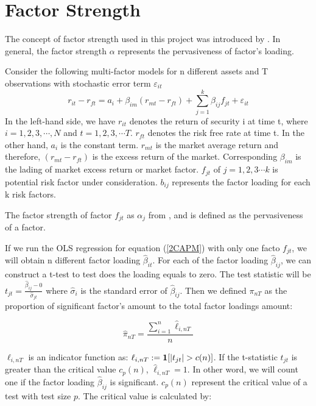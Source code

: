 \documentclass[12pt]{article}
\begin{document}
\section{Factor Strength}\label{strength}
The concept of factor strength used in this project was introduced by . 
In general, the factor strength $\alpha$ represents the pervasiveness of factor's loading.

Consider the following multi-factor models for n different assets and T observations with stochastic error term $\varepsilon_{it}$
\[   r_{it} - r_{ft} = a_i + \beta_{im}(r_{mt} - r_{ft}) + \sum_{j=1}^{k}\beta_{ij}f_{jt} + \varepsilon_{it} \tag{1}\label{2CAPM} \]
In the left-hand side, we have $r_{it}$ denotes the return of  security i at time t, where $i = 1, 2,3, \cdots, N$ and $t = 1,2,3, \cdots T$.  
$r_{ft}$ denotes the risk free rate at time t.
In the other hand, $a_i$ is the constant term. 
$r_{mt}$ is the market average return and therefore, $(r_{mt} - r_{ft}) $ is the excess return of the market. 
Corresponding $\beta_{im}$ is the lading of market excess return or market factor.
$f_{jt}$ of $j = 1, 2, 3\cdots k$ is potential risk factor under consideration.
$b_{ij}$ represents the factor loading for each k risk factors.

The factor strength of factor $f_{jt}$ as $\alpha_j$ from , and  is defined as the pervasiveness of a factor.

If we run the OLS regression for equation (\ref{2CAPM}) with only one facto  $f_{jt}$, we will obtain n different factor loading $\hat{\beta}_{it}$. For each of the  factor loading $\hat{\beta}_{ij}$, we can construct a t-test to test does the loading equals to zero. The test statistic will be $t_{jt} = \frac{\hat{\beta}_{ij} - 0}{\hat{\sigma}_{jt}}$ where $\hat{\sigma}_{i}$ is the standard error of $\hat{\beta}_{ij}$.  
Then we defined $\pi_{nT}$ as the proportion of significant factor's amount to the total factor loadings amount:

\[  \hat{\pi}_{nT} = \frac{\sum_{i=1}^n \hat{\ell}_{i,nT}}{n} \tag{2} \label{pi_function} \]

$\ell_{i,nT}$ is an indicator function as: $\ell_{i,nT} := {\bf1}[|t_{jt}|>c(n)]$. 
If the t-statistic $t_{jt}$ is greater than the critical value $c_p(n)$,  $\hat{\ell}_{i,nT} = 1$. 
In other word, we will count one if the factor loading $\hat{\beta}_{ij}$ is significant. 
$c_p(n)$ represent the critical value of a test with test size $p$. 
The critical value is calculated by:
\end{document}
